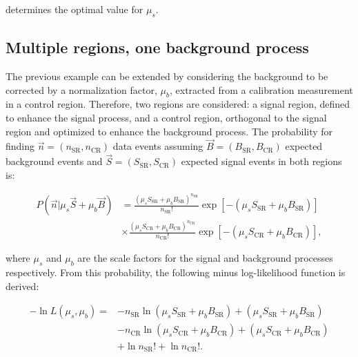 \noindent determines the optimal value for $\mu_s$.


\subsection{Multiple regions, one background process}

The previous example can be extended by considering the background to be corrected by a normalization factor, $\mu_b$, extracted from a calibration measurement in a control region.
Therefore, two regions are considered: a signal region, defined to enhance the signal process, and a control region, orthogonal to the signal region and optimized to enhance the background process.
The probability for finding $\vec{n} = (n_{\text{SR}}, n_{\text{CR}})$ data events assuming $\vec{B} = (B_{\text{SR}}, B_{\text{CR}})$ expected background events and $\vec{S} = (S_{\text{SR}}, S_{\text{CR}})$ expected signal events in both regions is:

\begin{equation}
\begin{split}
P(\vec{n} | \mu_s \vec{S} + \mu_b\vec{B}) &= \frac{(\mu_s S_{\text{SR}} + \mu_b B_{\text{SR}})^{n_{\text{SR}}}}{n_{\text{SR}}!} \exp{\left[-(\mu_s S_{\text{SR}} + \mu_b B_{\text{SR}})\right]} \\
& \times \frac{(\mu_s S_{\text{CR}} + \mu_b B_{\text{CR}})^{n_{\text{CR}}}}{n_{\text{CR}}!} \exp{\left[-(\mu_s S_{\text{CR}} + \mu_b B_{\text{CR}})\right]} ,
\end{split}
\label{eq:simplifiedPoissonControlRegion}
\end{equation}

\noindent where $\mu_s$ and $\mu_b$ are the scale factors for the signal and background processes respectively.
From this probability, the following minus log-likelihood function is derived:

\begin{equation}
\begin{split}
-\ln{L(\mu_s, \mu_b)} =& -n_{\text{SR}} \ln{(\mu_s S_{\text{SR}} + \mu_b B_{\text{SR}})} + (\mu_s S_{\text{SR}} + \mu_b B_{\text{SR}}) \\
                       & -n_{\text{CR}} \ln{(\mu_s S_{\text{CR}} + \mu_b B_{\text{CR}})} + (\mu_s S_{\text{CR}} + \mu_b B_{\text{CR}}) \\
                       & + \ln{n_{\text{SR}}!} + \ln{n_{\text{CR}}!}.
\end{split}
\label{eq:simplifiedLogLikelihoodControlRegion}
\end{equation}

